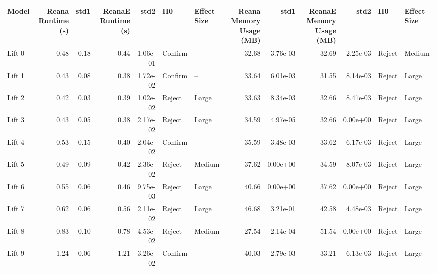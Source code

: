 \begin{tabular}{lrrrrllrrrrll}
\toprule
   Model &  Reana Runtime (s) &  std1 &  ReanaE Runtime (s) &      std2 &       H0 & Effect Size &  Reana Memory Usage (MB) &      std1 &  ReanaE Memory Usage (MB) &      std2 &       H0 & Effect Size \\
\midrule
  Lift 0 &               0.48 &  0.18 &                0.44 &  1.06e-01 &  Confirm &          -- &                    32.68 &  3.76e-03 &                     32.69 &  2.25e-03 &   Reject &      Medium \\
  Lift 1 &               0.43 &  0.08 &                0.38 &  1.72e-02 &  Confirm &          -- &                    33.64 &  6.01e-03 &                     31.55 &  8.14e-03 &   Reject &       Large \\
  Lift 2 &               0.42 &  0.03 &                0.39 &  1.02e-02 &   Reject &       Large &                    33.63 &  8.34e-03 &                     32.66 &  8.41e-03 &   Reject &       Large \\
  Lift 3 &               0.43 &  0.05 &                0.38 &  2.17e-02 &   Reject &       Large &                    34.59 &  4.97e-05 &                     32.66 &  0.00e+00 &   Reject &       Large \\
  Lift 4 &               0.53 &  0.15 &                0.40 &  2.04e-02 &  Confirm &          -- &                    35.59 &  3.48e-03 &                     33.62 &  6.17e-03 &   Reject &       Large \\
  Lift 5 &               0.49 &  0.09 &                0.42 &  2.36e-02 &   Reject &      Medium &                    37.62 &  0.00e+00 &                     34.59 &  8.07e-03 &   Reject &       Large \\
  Lift 6 &               0.55 &  0.06 &                0.46 &  9.75e-03 &   Reject &       Large &                    40.66 &  0.00e+00 &                     37.62 &  0.00e+00 &   Reject &       Large \\
  Lift 7 &               0.62 &  0.06 &                0.56 &  2.11e-02 &   Reject &       Large &                    46.68 &  3.21e-01 &                     42.58 &  4.48e-03 &   Reject &       Large \\
  Lift 8 &               0.83 &  0.10 &                0.78 &  4.53e-02 &   Reject &      Medium &                    27.54 &  2.14e-04 &                     51.54 &  0.00e+00 &   Reject &       Large \\
  Lift 9 &               1.24 &  0.06 &                1.21 &  3.26e-02 &  Confirm &          -- &                    40.03 &  2.79e-03 &                     33.21 &  6.13e-03 &   Reject &       Large \\

\end{tabular}
